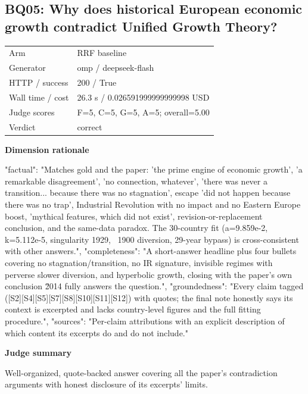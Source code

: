 \documentclass[10pt]{article}
\begin{document}
\subsection{BQ05: Why does historical European economic growth contradict Unified Growth Theory?}
\begin{tabular}{@{}ll@{}}
Arm & RRF baseline\\
Generator & omp / deepseek-flash\\
HTTP / success & 200 / True\\
Wall time / cost & 26.3 s / 0.026591999999999998 USD\\
Judge scores & F=5, C=5, G=5, A=5; overall=5.00\\
Verdict & correct\\
\end{tabular}

\textbf{Dimension rationale}
\begin{EvidenceText}
{
  "factual": "Matches gold and the paper: 'the prime engine of economic growth', 'a remarkable disagreement', 'no connection, whatever', 'there was never a transition... because there was no stagnation', escape 'did not happen because there was no trap', Industrial Revolution with no impact and no Eastern Europe boost, 'mythical features, which did not exist', revision-or-replacement conclusion, and the same-data paradox. The 30-country fit (a=9.859e-2, k=5.112e-5, singularity 1929, ~1900 diversion, 29-year bypass) is cross-consistent with other answers.",
  "completeness": "A short-answer headline plus four bullets covering no stagnation/transition, no IR signature, invisible regimes with perverse slower diversion, and hyperbolic growth, closing with the paper's own conclusion \u2014 fully answers the question.",
  "groundedness": "Every claim tagged ([S2][S4][S5][S7][S8][S10][S11][S12]) with quotes; the final note honestly says its context is excerpted and lacks country-level figures and the full fitting procedure.",
  "sources": "Per-claim attributions with an explicit description of which content its excerpts do and do not include."
}
\end{EvidenceText}

\textbf{Judge summary}
\begin{EvidenceText}
Well-organized, quote-backed answer covering all the paper's contradiction arguments with honest disclosure of its excerpts' limits.
\end{EvidenceText}
\end{document}
